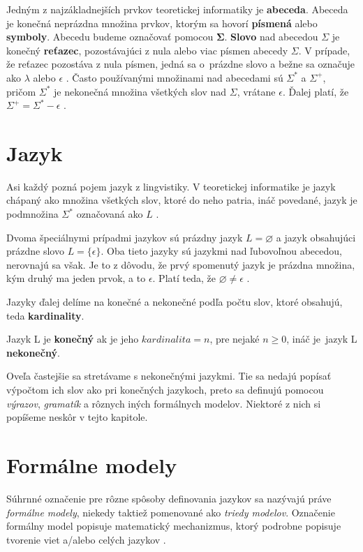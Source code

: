 Jedným z najzákladnejších prvkov teoretickej informatiky je \textbf{abeceda}. Abeceda je konečná neprázdna množina prvkov, ktorým sa hovorí \textbf{písmená} alebo \textbf{symboly}. Abecedu budeme označovať pomocou $\mathbf{\Sigma} $. \textbf{Slovo}  nad abecedou $ \Sigma $ je konečný \textbf{reťazec}, pozostávajúci z nula alebo viac písmen abecedy $\Sigma$. V prípade, že reťazec pozostáva z nula písmen, jedná sa o~prázdne slovo a bežne sa označuje ako $\lambda$ alebo $\epsilon$ \cite{salomaa}. Často používanými množinami nad abecedami sú $ \Sigma^* $ a $ \Sigma^+ $, pričom $\Sigma^*$ je nekonečná množina všetkých slov nad $\Sigma$, vrátane $\epsilon$. Ďalej platí, že $ \Sigma^+ = \Sigma^* - \epsilon $ \cite{salomaa}.

\section{Jazyk}
Asi každý pozná pojem jazyk z lingvistiky. V teoretickej informatike je jazyk chápaný ako množina všetkých slov, ktoré do neho patria, ináč povedané, jazyk je podmnožina $ \Sigma^* $ \cite{salomaa} označovaná ako $ L $ .

Dvoma špeciálnymi prípadmi jazykov sú prázdny jazyk $ L = \varnothing$ a jazyk obsahujúci prázdne slovo $ L = \{ \epsilon \} $. Oba tieto jazyky sú jazykmi nad ľubovoľnou abecedou, nerovnajú sa však. Je to z dôvodu, že prvý spomenutý jazyk je prázdna množina, kým druhý ma jeden prvok, a to $\epsilon$. Platí teda, že $ \varnothing \neq \epsilon $ \cite{medunaBase}.

Jazyky ďalej delíme na konečné a nekonečné podľa počtu slov, ktoré obsahujú, teda \textbf{kardinality}.

\begin{definition}
Jazyk L je \textbf{konečný} ak je jeho $kardinalita = n$, pre nejaké $n\geq 0$, ináč je~jazyk L \textbf{nekonečný}.
\end{definition}

Oveľa častejšie sa stretávame s nekonečnými jazykmi. Tie sa nedajú popísať výpočtom ich slov ako pri konečných jazykoch, preto sa definujú pomocou \textit{výrazov}, \textit{gramatík} a rôznych iných formálnych modelov. Niektoré z nich si popíšeme neskôr v tejto kapitole.

\section{Formálne modely}
\label{formalModel}
Súhrnné označenie pre rôzne spôsoby definovania jazykov sa nazývajú práve \textit{formálne modely}, niekedy taktiež pomenované ako \textit{triedy modelov}. Označenie formálny model popisuje matematický mechanizmus, ktorý podrobne popisuje tvorenie viet a/alebo celých jazykov \cite{krivka}.

